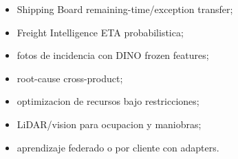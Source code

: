 \documentclass[
  spanish,
  10pt,
  a4paper,
]{article}
\providecommand{\tightlist}{%
  \setlength{\itemsep}{0pt}\setlength{\parskip}{0pt}}
\begin{document}
\begin{itemize}
\tightlist
\item
  Shipping Board remaining-time/exception transfer;
\item
  Freight Intelligence ETA probabilistica;
\item
  fotos de incidencia con DINO frozen features;
\item
  root-cause cross-product;
\item
  optimizacion de recursos bajo restricciones;
\item
  LiDAR/vision para ocupacion y maniobras;
\item
  aprendizaje federado o por cliente con adapters.
\end{itemize}
\end{document}
